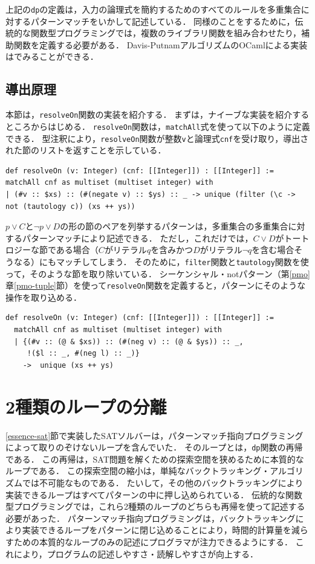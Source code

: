 上記の\lstinline{dp}の定義は，入力の論理式を簡約するためのすべてのルールを多重集合に対するパターンマッチをいかして記述している．
同様のことをするために，伝統的な関数型プログラミングでは，複数のライブラリ関数を組み合わせたり，補助関数を定義する必要がある．
Davis-PutnamアルゴリズムのOCamlによる実装は\cite{harrison2009handbook}でみることができる．

\subsection{導出原理}

本節は，\lstinline{resolveOn}関数の実装を紹介する．
まずは，ナイーブな実装を紹介するところからはじめる．
\lstinline{resolveOn}関数は，\lstinline{matchAll}式を使って以下のように定義できる．
型注釈により，\lstinline{resolveOn}関数が整数\lstinline{v}と論理式\lstinline{cnf}を受け取り，導出された節のリストを返すことを示している．
\begin{lstlisting}[language=egison,numbers=none]
def resolveOn (v: Integer) (cnf: [[Integer]]) : [[Integer]] := matchAll cnf as multiset (multiset integer) with
| (#v :: $xs) :: (#(negate v) :: $ys) :: _ -> unique (filter (\c -> not (tautology c)) (xs ++ ys))
\end{lstlisting}
$p \lor C$と$\neg p \lor D$の形の節のペアを列挙するパターンは，多重集合の多重集合に対するパターンマッチにより記述できる．
ただし，これだけでは，$C \lor D$がトートロジーな節である場合（$C$がリテラル$q$を含みかつ$D$がリテラル$\neg q$を含む場合そうなる）にもマッチしてしまう．
そのために，\lstinline{filter}関数と\lstinline{tautology}関数を使って，そのような節を取り除いている．
シーケンシャル・notパターン（第\ref{pmo}章\ref{pmo-tuple}節）を使って\lstinline{resolveOn}関数を定義すると，パターンにそのような操作を取り込める．
\begin{lstlisting}[language=egison,numbers=none]
def resolveOn (v: Integer) (cnf: [[Integer]]) : [[Integer]] :=
  matchAll cnf as multiset (multiset integer) with
  | {(#v :: (@ & $xs)) :: (#(neg v) :: (@ & $ys)) :: _,
     !($l :: _, #(neg l) :: _)}
    ->  unique (xs ++ ys)
\end{lstlisting}

\section{2種類のループの分離}\label{essence-pmo}

\ref{essence-sat}節で実装したSATソルバーは，パターンマッチ指向プログラミングによって取りのぞけないループを含んでいた．
そのループとは，\lstinline{dp}関数の再帰である．
この再帰は，SAT問題を解くための探索空間を狭めるために本質的なループである．
この探索空間の縮小は，単純なバックトラッキング・アルゴリズムでは不可能なものである．
たいして，その他のバックトラッキングにより実装できるループはすべてパターンの中に押し込められている．
伝統的な関数型プログラミングでは，これら2種類のループのどちらも再帰を使って記述する必要があった．
パターンマッチ指向プログラミングは，バックトラッキングにより実装できるループをパターンに閉じ込めることにより，時間的計算量を減らすための本質的なループのみの記述にプログラマが注力できるようにする．
これにより，プログラムの記述しやすさ・読解しやすさが向上する．


